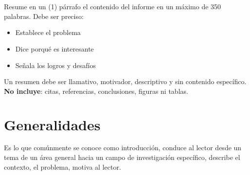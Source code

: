 \documentclass[12pt]{report}
\renewenvironment{abstract}{%
\chapter*{\abstractname}%
\addcontentsline{toc}{chapter}{\abstractname}%
}{}
\begin{document}
	
\maketitle

\cleardoublepage
{}
\setcounter{page}{1}

\tableofcontents
\listoffigures
\renewcommand{\listtablename}{Índice de tablas}\listoftables
\renewcommand{\lstlistlistingname}{Índice de algoritmos}
\lstlistoflistings

\cleardoublepage
{}
\setcounter{page}{1}






\begin{abstract}\thispagestyle{empty}

Resume en un (1) párrafo el contenido del informe en un máximo de 350 palabras.
Debe ser preciso:
\begin{itemize}\justifying
  \item Establece el problema
  \item Dice porqué es interesante
  \item Señala los logros y desafíos
\end{itemize}
Un resumen debe ser llamativo, motivador, descriptivo y sin contenido específico. \textbf{No incluye}: citas, referencias, conclusiones, figuras ni tablas.



\end{abstract}

\cleardoublepage
{}
\setcounter{page}{1}








\chapter{Generalidades}
Es lo que comúnmente se conoce como introducción, conduce al lector desde un tema de un área general hacia un campo de investigación específico, describe el contexto, el problema, motiva al lector.
\end{document}

